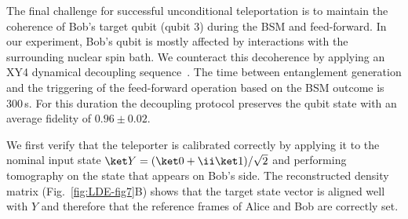 The final challenge for successful unconditional teleportation is to maintain the coherence of Bob's target qubit (qubit 3) during the BSM and feed-forward. In our experiment, Bob's qubit is mostly affected by interactions with the surrounding nuclear spin bath. We counteract this decoherence by applying an XY4 dynamical decoupling sequence~\cite{Lange_Science_2010}. The time between entanglement generation and the triggering of the feed-forward operation based on the BSM outcome is 300\,\textmicro s. For this duration the decoupling protocol preserves the qubit state with an average fidelity of $0.96\pm0.02$.

We first verify that the teleporter is calibrated correctly by applying it to the nominal input state $\ket Y = (\ket0+\ii\ket1)/\sqrt2$ and performing tomography on the state that appears on Bob's side. The reconstructed density matrix (Fig.~\ref{fig:LDE-fig7}B) shows that the target state vector is aligned well with $Y$ and therefore that the reference frames of Alice and Bob are correctly set.

